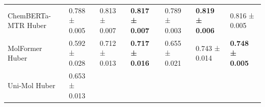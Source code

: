 \documentclass[
  10pt,
]{article}
\begin{document}
\begin{longtable}[]{@{}lllllll@{}}
\begin{minipage}[t]{0.12\columnwidth}
ChemBERTa-MTR Huber\strut
\end{minipage} & \begin{minipage}[t]{0.12\columnwidth}\raggedright
0.788 ± 0.005\strut
\end{minipage} & \begin{minipage}[t]{0.12\columnwidth}\raggedright
0.813 ± 0.007\strut
\end{minipage} & \begin{minipage}[t]{0.12\columnwidth}\raggedright
\textbf{0.817 ± 0.007}\strut
\end{minipage} & \begin{minipage}[t]{0.12\columnwidth}\raggedright
0.789 ± 0.003\strut
\end{minipage} & \begin{minipage}[t]{0.12\columnwidth}\raggedright
\textbf{0.819 ± 0.006}\strut
\end{minipage} & \begin{minipage}[t]{0.12\columnwidth}\raggedright
0.816 ± 0.005\strut
\end{minipage}\tabularnewline
\begin{minipage}[t]{0.12\columnwidth}\raggedright
MolFormer Huber\strut
\end{minipage} & \begin{minipage}[t]{0.12\columnwidth}\raggedright
0.592 ± 0.028\strut
\end{minipage} & \begin{minipage}[t]{0.12\columnwidth}\raggedright
0.712 ± 0.013\strut
\end{minipage} & \begin{minipage}[t]{0.12\columnwidth}\raggedright
\textbf{0.717 ± 0.016}\strut
\end{minipage} & \begin{minipage}[t]{0.12\columnwidth}\raggedright
0.655 ± 0.021\strut
\end{minipage} & \begin{minipage}[t]{0.12\columnwidth}\raggedright
0.743 ± 0.014\strut
\end{minipage} & \begin{minipage}[t]{0.12\columnwidth}\raggedright
\textbf{0.748 ± 0.005}\strut
\end{minipage}\tabularnewline
\begin{minipage}[t]{0.12\columnwidth}\raggedright
Uni-Mol Huber\strut
\end{minipage} & \begin{minipage}[t]{0.12\columnwidth}\raggedright
0.653 ± 0.013\strut
\end{minipage} & \begin{minipage}[t]{0.12\columnwidth}\raggedright

\end{minipage}
\end{longtable}
\end{document}
